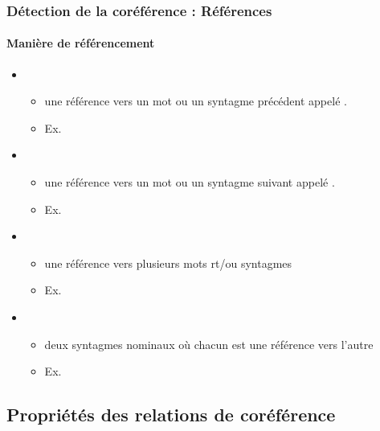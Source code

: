 \documentclass[xcolor=table]{beamer}
\begin{document}
\begin{frame}
	\frametitle{Détection de la coréférence : Références}
	\framesubtitle{Manière de référencement}
	
	\begin{itemize}
		\item {}
		\begin{itemize}
			\item une référence vers un mot ou un syntagme précédent appelé .
			\item Ex. 
		\end{itemize}
	
		\item {}
		\begin{itemize}
			\item une référence vers un mot ou un syntagme suivant appelé .
			\item Ex. 
		\end{itemize}
	
		\item {}
		\begin{itemize}
			\item une référence vers plusieurs mots rt/ou syntagmes
			\item Ex. 
		\end{itemize}
	
		\item {}
		\begin{itemize}
			\item deux syntagmes nominaux où chacun est une référence vers l'autre
			\item Ex. 
		\end{itemize}
	\end{itemize}
	
\end{frame}

\subsection{Propriétés des relations de coréférence}
\end{document}
